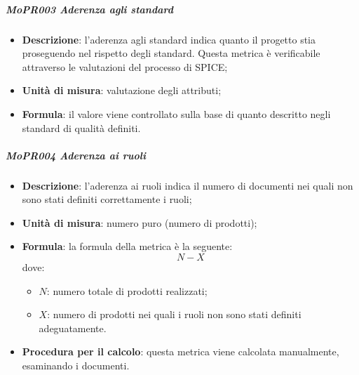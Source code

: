 \subparagraph{MoPR003 Aderenza agli standard}
\begin{itemize}
  \item \textbf{Descrizione}: l'aderenza agli standard indica quanto il progetto stia proseguendo nel rispetto degli standard. Questa metrica è verificabile attraverso le valutazioni del processo di SPICE;
  \item \textbf{Unità di misura}: valutazione degli attributi;
  \item \textbf{Formula}: il valore viene controllato sulla base di quanto descritto negli standard di qualità definiti.
\end{itemize}

\subparagraph{MoPR004 Aderenza ai ruoli}
\begin{itemize}
  \item \textbf{Descrizione}: l'aderenza ai ruoli indica il numero di documenti nei quali non sono stati definiti correttamente i ruoli;
  \item \textbf{Unità di misura}: numero puro (numero di prodotti);
  \item \textbf{Formula}: la formula della metrica è la seguente:
  \begin{displaymath}
    N - X
  \end{displaymath}
  dove:
  \begin{itemize}
    \item $ N $: numero totale di prodotti realizzati;
    \item $ X $: numero di prodotti nei quali i ruoli non sono stati definiti adeguatamente.
  \end{itemize}
  \item \textbf{Procedura per il calcolo}: questa metrica viene calcolata manualmente, esaminando i documenti.
\end{itemize}

